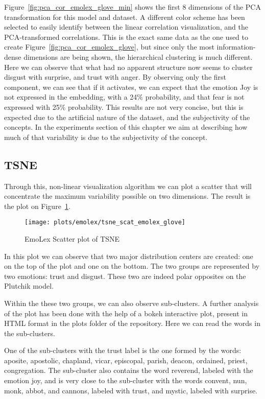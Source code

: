 Figure~\ref{fig:pca_cor_emolex_glove_min} shows the first 8 dimensions of the PCA transformation for this model and dataset. A different color scheme has been selected to easily identify between the linear correlation visualization, and the PCA-transformed correlations. This is the exact same data as the one used to create Figure~\ref{fig:pca_cor_emolex_glove}, but since only the most information-dense dimensions are being shown, the hierarchical clustering is much different. Here we can observe that what had no apparent structure now seems to cluster disgust with surprise, and trust with anger. By observing only the first component, we can see that if it activates, we can expect that the emotion Joy is not expressed in the embedding, with a 24\% probability, and that fear is not expressed with 25\% probability. This results are not very concise, but this is expected due to the artificial nature of the dataset, and the subjectivity of the concepts. In the experiments section of this chapter we aim at describing how much of that variability is due to the subjectivity of the concept.

\subsection{TSNE}
Through this, non-linear visualization algorithm we can plot a scatter that will concentrate the maximum variability possible on two dimensions. The result is the plot on Figure~\ref{fig:tsne_scat_emolex_glove}.

\begin{figure}[H]
  \texttt{[image: plots/emolex/tsne\_scat\_emolex\_glove]}
  \centering
  \caption{EmoLex Scatter plot of TSNE}\label{fig:tsne_scat_emolex_glove}
\end{figure}

In this plot we can observe that two major distribution centers are created: one on the top of the plot and one on the bottom. The two groups are represented by two emotions: trust and disgust. These two are indeed polar opposites on the Plutchik model.

Within the these two groups, we can also observe sub-clusters. A further analysis of the plot has been done with the help of a bokeh interactive plot, present in HTML format in the plots folder of the repository. Here we can read the words in the sub-clusters.

One of the sub-clusters with the trust label is the one formed by the words: aposite, apostolic, chapland, vicar, episcopal, parish, deacon, ordained, priest, congregation. The sub-cluster also contains the word reverend, labeled with the emotion joy, and is very close to the sub-cluster with the words convent, nun, monk, abbot, and cannons, labeled with trust, and mystic, labeled with surprise.

